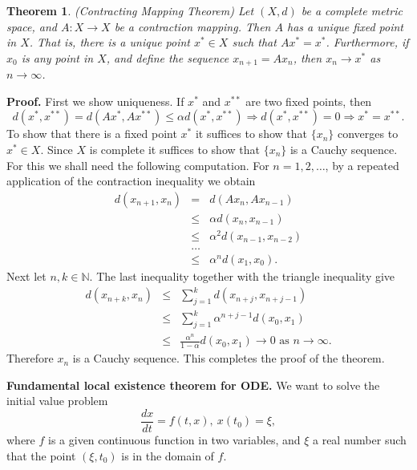 \documentclass[12pt]{report}
\newtheorem{theorem}{Theorem}[section]
\begin{document}
\begin{theorem}
\label{th:contr-map} (Contracting Mapping Theorem)
Let $(X, d)$ be a complete metric space, and $A:X \to X$ be a
contraction mapping.
Then $A$ has a unique fixed point in $X$.
That is,  there is a unique point $ x^\ast\in X$ such
that $Ax^\ast = x^\ast$. Furthermore, if $x_0$ is any point in $X$,
and define the sequence $x_{n+1}=Ax_n$, then
$x_n\to x^\ast$ as $n\to\infty$.
\end{theorem}
{\bf Proof.}  First we show uniqueness.
 If $x^{\ast}$ and
$x^{\ast\ast}$ are two fixed points, then
\[
d(x^{\ast}, x^{\ast\ast}) = d(Ax^{\ast},  Ax^{\ast\ast}) \le \alpha
d(x^{\ast}, x^{\ast\ast}) \Longrightarrow d(x^{\ast}, x^{\ast\ast}) = 0
\Longrightarrow x^{\ast} = x^{\ast \ast}.
\]
To show that there is a fixed point $x^{\ast}$
it suffices to show that $\{x_n\}$ converges to $x^{\ast}\in X$.
Since $X$ is complete it suffices to show
that $\{x_n\}$ is a Cauchy sequence.  
For this we shall need the following computation.  For $n = 1, 2,
\dots$, by a repeated application of the contraction
inequality we obtain 
\begin{eqnarray*}
d(x_{n+1}, x_n) &=& d(Ax_n, Ax_{n-1})\\
&\le& \alpha d(x_n, x_{n-1})\\
&\le& \alpha^2 d(x_{n-1}, x_{n-2})\\
&\dots& \\
&\le& \alpha^n d(x_1, x_0).
\end{eqnarray*}
Next let $n, k \in \mathbb{N}$. The last inequality
together with the triangle inequality give
\begin{eqnarray*}
d(x_{n+k}, x_n) &\le& \sum^k_{j=1} d(x_{n+j}, x_{n+j-1})\\
 &\le& \sum^k_{j=1} \alpha^{n+j-1} d(x_0, x_1)\\
&\le& \frac{\alpha^n}{1 - \alpha} d(x_0, x_1) \to 0 \mbox{ as } n \to
\infty.
\end{eqnarray*}
Therefore $x_n$ is a Cauchy sequence. This completes the proof
of the theorem.

\vspace{2mm}
\noindent
{\bf Fundamental local existence theorem for  ODE.}
We want to solve the initial value problem
\[
\frac{dx}{dt} = f(t, x), \ x(t_0) = \xi,
\]
where $f$ is  a given continuous function in two variables,
and $\xi$ a real number such that the point $(\xi, t_0)$
is in the domain of $f$. 
\end{document}
